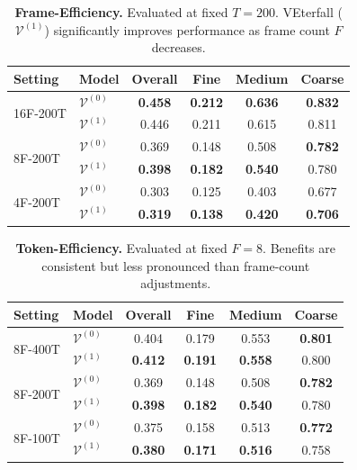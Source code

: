 \begin{table}[t]
    \centering
    \caption{\textbf{Frame-Efficiency.} Evaluated at fixed $T=200$. VEterfall ($\mathcal{V}^{(1)}$) significantly improves performance as frame count $F$ decreases.}
    \label{mglvr:tab:frame_eff}
    \begin{tabular}{@{}ll|*{4}{c}@{}}
        \toprule
        Setting & Model & Overall & Fine & Medium & Coarse \\
        \midrule
        \multirow{2}{*}{16F-200T}
          & $\mathcal{V}^{(0)}$ & \textbf{0.458} & \textbf{0.212} & \textbf{0.636} & \textbf{0.832} \\
          & $\mathcal{V}^{(1)}$ & 0.446 & 0.211 & 0.615 & 0.811 \\
        \cmidrule(lr){1-6}
        \multirow{2}{*}{8F-200T}
          & $\mathcal{V}^{(0)}$ & 0.369 & 0.148 & 0.508 & \textbf{0.782} \\
          & $\mathcal{V}^{(1)}$ & \textbf{0.398} & \textbf{0.182} & \textbf{0.540} & 0.780 \\
        \cmidrule(lr){1-6}
        \multirow{2}{*}{4F-200T}
          & $\mathcal{V}^{(0)}$ & 0.303 & 0.125 & 0.403 & 0.677 \\
          & $\mathcal{V}^{(1)}$ & \textbf{0.319} & \textbf{0.138} & \textbf{0.420} & \textbf{0.706} \\
        \bottomrule
    \end{tabular}
\end{table}

\begin{table}[t]
    \centering
    \caption{\textbf{Token-Efficiency.} Evaluated at fixed $F=8$. Benefits are consistent but less pronounced than frame-count adjustments.}
    \label{mglvr:tab:token_eff}
    \begin{tabular}{@{}ll|*{4}{c}@{}}
        \toprule
        Setting & Model & Overall & Fine & Medium & Coarse \\
        \midrule
        \multirow{2}{*}{8F-400T}
          & $\mathcal{V}^{(0)}$ & 0.404 & 0.179 & 0.553 & \textbf{0.801} \\
          & $\mathcal{V}^{(1)}$ & \textbf{0.412} & \textbf{0.191} & \textbf{0.558} & 0.800 \\
        \cmidrule(lr){1-6}
        \multirow{2}{*}{8F-200T}
          & $\mathcal{V}^{(0)}$ & 0.369 & 0.148 & 0.508 & \textbf{0.782} \\
          & $\mathcal{V}^{(1)}$ & \textbf{0.398} & \textbf{0.182} & \textbf{0.540} & 0.780 \\
        \cmidrule(lr){1-6}
        \multirow{2}{*}{8F-100T}
          & $\mathcal{V}^{(0)}$ & 0.375 & 0.158 & 0.513 & \textbf{0.772} \\
          & $\mathcal{V}^{(1)}$ & \textbf{0.380} & \textbf{0.171} & \textbf{0.516} & 0.758 \\
        \bottomrule
    \end{tabular}
\end{table}

